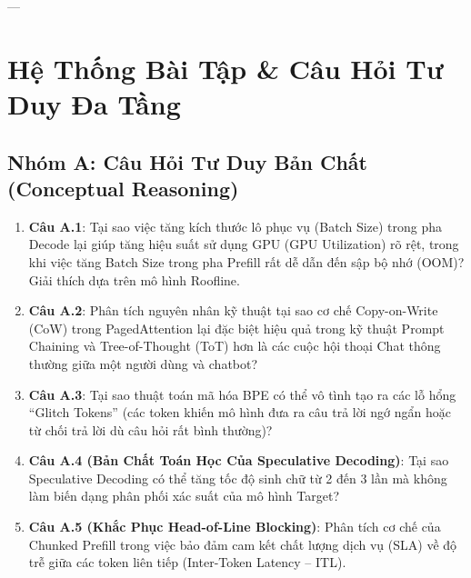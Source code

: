 ---

\section{Hệ Thống Bài Tập \& Câu Hỏi Tư Duy Đa Tầng}
\label{sec:ch07-exercises}

\subsection{Nhóm A: Câu Hỏi Tư Duy Bản Chất (Conceptual Reasoning)}
\begin{enumerate}
  \item \textbf{Câu A.1}: Tại sao việc tăng kích thước lô phục vụ (Batch Size) trong pha Decode lại giúp tăng hiệu suất sử dụng GPU (GPU Utilization) rõ rệt, trong khi việc tăng Batch Size trong pha Prefill rất dễ dẫn đến sập bộ nhớ (OOM)? Giải thích dựa trên mô hình Roofline.
  \item \textbf{Câu A.2}: Phân tích nguyên nhân kỹ thuật tại sao cơ chế Copy-on-Write (CoW) trong PagedAttention lại đặc biệt hiệu quả trong kỹ thuật Prompt Chaining và Tree-of-Thought (ToT) hơn là các cuộc hội thoại Chat thông thường giữa một người dùng và chatbot?
  \item \textbf{Câu A.3}: Tại sao thuật toán mã hóa BPE có thể vô tình tạo ra các lỗ hổng ``Glitch Tokens'' (các token khiến mô hình đưa ra câu trả lời ngớ ngẩn hoặc từ chối trả lời dù câu hỏi rất bình thường)?
  \item \textbf{Câu A.4 (Bản Chất Toán Học Của Speculative Decoding)}: Tại sao Speculative Decoding có thể tăng tốc độ sinh chữ từ 2 đến 3 lần mà không làm biến dạng phân phối xác suất của mô hình Target?
  \item \textbf{Câu A.5 (Khắc Phục Head-of-Line Blocking)}: Phân tích cơ chế của Chunked Prefill trong việc bảo đảm cam kết chất lượng dịch vụ (SLA) về độ trễ giữa các token liên tiếp (Inter-Token Latency -- ITL).
\end{enumerate}

